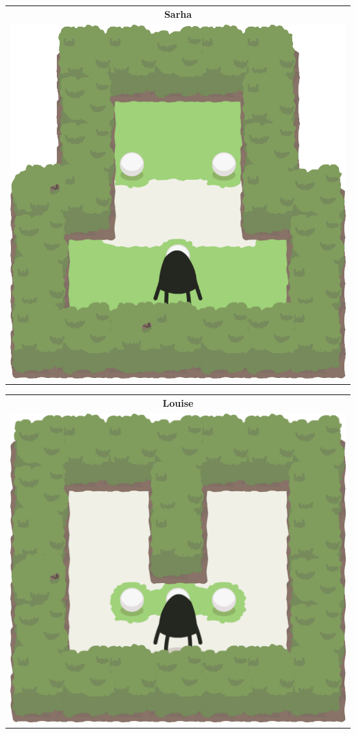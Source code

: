 \documentclass{report}
\theoremstyle{plain}
\begin{document}
\begin{center}
\begin{tabular}{c}
\end{tabular}
\begin{tabular}{c}
\textbf{Sarha} \\
\includegraphics[scale=\levelAnnexWidth]{sarha-1.png}
\end{tabular}
\begin{tabular}{c}
\textbf{Louise} \\
\includegraphics[scale=\levelAnnexWidth]{louise-1.png}

\end{tabular}
\end{center}
\end{document}
